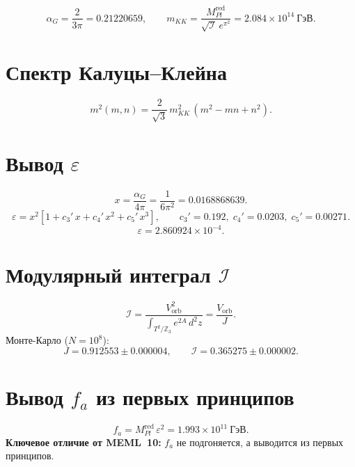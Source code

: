 \documentclass[12pt,a4paper]{article}
\numberwithin{equation}{section}
\begin{document}
\begin{equation}
\alpha_G = \frac{2}{3\pi} = 0.21220659, \qquad 
m_{KK} = \frac{M_{Pl}^{\text{red}}}{\sqrt{\mathcal{I}}\,e^{\pi^2}} 
= 2.084\times 10^{14}~\text{ГэВ}.
\end{equation}

\section{Спектр Калуцы--Клейна}
\begin{equation}
m^2(m,n) = \frac{2}{\sqrt3}\,m_{KK}^2\,(m^2 - mn + n^2).
\end{equation}

\section{Вывод $\varepsilon$}
\begin{equation}
x = \frac{\alpha_G}{4\pi} = \frac{1}{6\pi^2} = 0.0168868639.
\end{equation}
\begin{equation}
\varepsilon = x^2\left[1 + c_3'\,x + c_4'\,x^2 + c_5'\,x^3\right], 
\qquad c_3' = 0.192, \; c_4' = 0.0203, \; c_5' = 0.00271.
\end{equation}
\begin{equation}
\varepsilon = 2.860924\times 10^{-4}.
\end{equation}

\section{Модулярный интеграл $\mathcal{I}$}
\begin{equation}
\mathcal{I} = \frac{V_{\text{orb}}^2}
{\int_{T^2/\mathbb{Z}_3} e^{2A}\,d^2z} = \frac{V_{\text{orb}}}{J}.
\end{equation}
Монте-Карло ($N = 10^8$):
\begin{equation}
J = 0.912553 \pm 0.000004, \qquad \mathcal{I} = 0.365275 \pm 0.000002.
\end{equation}

\section{Вывод $f_a$ из первых принципов}
\begin{equation}
\boxed{\;f_a = M_{Pl}^{\text{red}}\,\varepsilon^2 
= 1.993\times 10^{11}~\text{ГэВ}.\;}
\end{equation}
\textbf{Ключевое отличие от MEML~10:} $f_a$ не подгоняется, 
а выводится из первых принципов.
\end{document}
